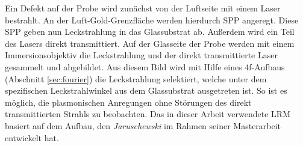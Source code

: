 \documentclass[titlepage,  ngerman]{article}
\begin{document}
	Ein Defekt auf der Probe wird zunächst von der Luftseite mit einem Laser bestrahlt. An der Luft-Gold-Grenzfläche werden hierdurch SPP angeregt. Diese SPP geben nun Leckstrahlung in das Glassubstrat ab.
	Außerdem wird ein Teil des Lasers direkt transmittiert. Auf der Glasseite der Probe werden mit einem Immersionsobjektiv die Leckstrahlung und der direkt transmittierte Laser gesammelt und abgebildet.	
	Aus diesem Bild wird mit Hilfe eines 4f-Aufbaus (Abschnitt \ref{sec:fourier}) die Leckstrahlung selektiert, welche unter dem spezifischen Leckstrahlwinkel aus dem Glassubstrat ausgetreten ist. So ist es möglich, die plasmonischen Anregungen ohne Störungen des direkt transmittierten Strahls zu beobachten. Das in dieser Arbeit verwendete LRM basiert auf dem Aufbau, den \textit{Jaruschewski} im Rahmen seiner Masterarbeit \cite{Jaruschewski.2020} entwickelt hat.
\end{document}
